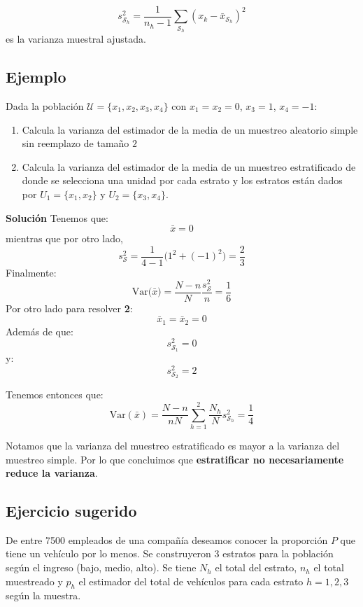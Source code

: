 \documentclass[
]{book}
\providecommand{\tightlist}{%
  \setlength{\itemsep}{0pt}\setlength{\parskip}{0pt}}
\begin{document}
\[
s^2_{\mathcal{S}_h} = \dfrac{1}{n_h - 1}\sum\limits_{\mathcal{S}_h}(x_k - \bar{x}_{\mathcal{S}_h})^2
\]
es la varianza muestral ajustada.

\hypertarget{ejemplo-2}{%
\subsection{Ejemplo}\label{ejemplo-2}}

Dada la población \(\mathcal{U} = \{ x_1, x_2, x_3, x_4 \}\) con \(x_1 = x_2 = 0\), \(x_3 = 1\), \(x_4 = -1\):

\begin{enumerate}
\def\labelenumi{\arabic{enumi}.}
\tightlist
\item
  Calcula la varianza del estimador de la media de un muestreo aleatorio simple sin reemplazo de tamaño \(2\)
\item
  Calcula la varianza del estimador de la media de un muestreo estratificado de donde se selecciona una unidad por cada estrato y los estratos están dados por \(U_1 = \{ x_1, x_2\}\) y \(U_2 = \{ x_3, x_4\}\).
\end{enumerate}

\textbf{Solución}
Tenemos que:
\[
\bar{x} = 0
\]
mientras que por otro lado,
\[
s^2_{\mathcal{S}} = \frac{1}{4 - 1} \big( 1^2 + (-1)^2) = \frac{2}{3}
\]
Finalmente:
\[
\textrm{Var}\big( \bar{x}\big) = \frac{N - n}{N} \frac{s^2_{\mathcal{S}}}{n} = \frac{1}{6}
\]
Por otro lado para resolver \textbf{2}:
\[
\bar{x}_1 = \bar{x}_2 = 0
\]
Además de que:
\[
s^2_{\mathcal{S}_1} = 0
\]
y:
\[
s^2_{\mathcal{S}_2} = 2
\]

Tenemos entonces que:
\[
\textrm{Var}( \bar{x} ) = \dfrac{N - n}{nN}\sum_{h = 1}^2\frac{N_h}{N}s^2_{\mathcal{S}_h} = \frac{1}{4}
\]

Notamos que la varianza del muestreo estratificado es mayor a la varianza del muestreo simple. Por lo que concluimos que \textbf{estratificar no necesariamente reduce la varianza}.

\hypertarget{ejercicio-sugerido-1}{%
\subsection{Ejercicio sugerido}\label{ejercicio-sugerido-1}}

De entre 7500 empleados de una compañía deseamos conocer la proporción \(P\) que tiene un vehículo por lo menos. Se construyeron \(3\) estratos para la población según el ingreso (bajo, medio, alto). Se tiene \(N_h\) el total del estrato, \(n_h\) el total muestreado y \(p_h\)
el estimador del total de vehículos para cada estrato \(h = 1,2,3\) según la muestra.
\end{document}
